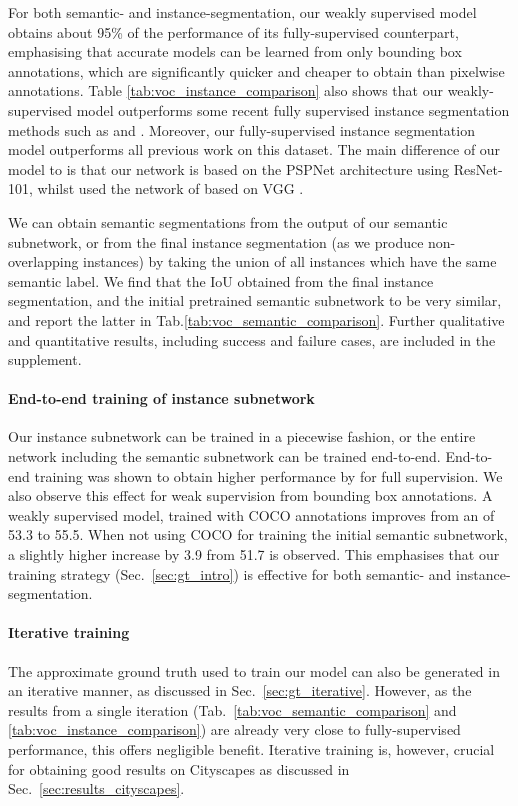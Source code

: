 \documentclass[runningheads]{llncs}
\begin{document}
For both semantic- and instance-segmentation, our weakly supervised model obtains about 95\% of the performance of its fully-supervised counterpart, emphasising that accurate models can be learned from only bounding box annotations, which are significantly quicker and cheaper to obtain than pixelwise annotations.
Table \ref{tab:voc_instance_comparison} also shows that our weakly-supervised model outperforms some recent fully supervised instance segmentation methods such as \cite{arnab_bmvc_2016} and \cite{liang_arxiv_2015}.
Moreover, our fully-supervised instance segmentation model outperforms all previous work on this dataset.
The main difference of our model to \cite{arnab_cvpr_2017} is that our network is based on the PSPNet architecture using ResNet-101, whilst \cite{arnab_cvpr_2017} used the network of \cite{arnab_eccv_2016} based on VGG \cite{simonyan_iclr_2015}.

We can obtain semantic segmentations from the output of our semantic subnetwork, or from the final instance segmentation (as we produce non-overlapping instances) by taking the union of all instances which have the same semantic label.
We find that the IoU obtained from the final instance segmentation, and the initial pretrained semantic subnetwork to be very similar, and report the latter in Tab.\ref{tab:voc_semantic_comparison}.
Further qualitative and quantitative results, including success and failure cases, are included in the supplement.

\paragraph{End-to-end training of instance subnetwork}
Our instance subnetwork can be trained in a piecewise fashion, or the entire network including the semantic subnetwork can be trained end-to-end.
End-to-end training was shown to obtain higher performance by \cite{arnab_cvpr_2017} for full supervision.
We also observe this effect for weak supervision from bounding box annotations.
A weakly supervised model, trained with COCO annotations improves from an  of 53.3 to 55.5.
When not using COCO for training the initial semantic subnetwork, a slightly higher increase by 3.9 from 51.7 is observed.
This emphasises that our training strategy (Sec.~\ref{sec:gt_intro}) is effective for both semantic- and instance-segmentation.

\paragraph{Iterative training} The approximate ground truth used to train our model can also be generated in an iterative manner, as discussed in Sec.~\ref{sec:gt_iterative}.
However, as the results from a single iteration (Tab.~\ref{tab:voc_semantic_comparison} and \ref{tab:voc_instance_comparison}) are already very close to fully-supervised performance, this offers negligible benefit.
Iterative training is, however, crucial for obtaining good results on Cityscapes as discussed in Sec.~\ref{sec:results_cityscapes}.
\end{document}
